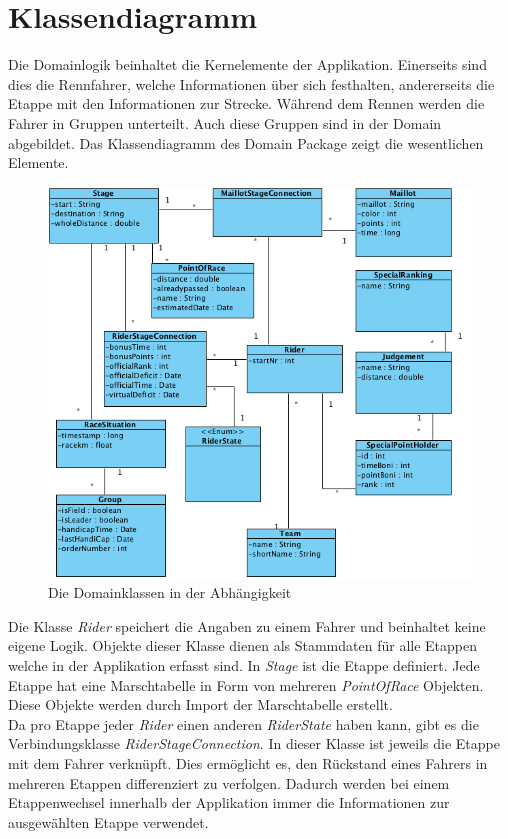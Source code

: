 \section{Klassendiagramm}
Die Domainlogik beinhaltet die Kernelemente der Applikation. Einerseits sind dies die Rennfahrer, welche Informationen über sich festhalten, andererseits die Etappe mit den Informationen zur Strecke. Während dem Rennen werden die Fahrer in Gruppen unterteilt. Auch diese Gruppen sind in der Domain abgebildet. Das Klassendiagramm des Domain Package zeigt die wesentlichen Elemente.

\begin{figure}[h!]
\caption{Die Domainklassen in der Abhängigkeit}
\label{fig:domain}
\centering
\includegraphics[scale=0.9]{05bericht/images/domain.png}
\end{figure} 


Die Klasse \textit{Rider} speichert die Angaben zu einem Fahrer und beinhaltet keine eigene Logik. Objekte dieser Klasse dienen als Stammdaten für alle Etappen welche in der Applikation erfasst sind.
In \textit{Stage} ist die Etappe definiert. Jede Etappe hat eine Marschtabelle in Form von mehreren \textit{PointOfRace} Objekten. Diese Objekte werden durch Import der Marschtabelle erstellt.
\\

Da pro Etappe jeder \textit{Rider} einen anderen \textit{RiderState} haben kann, gibt es die Verbindungsklasse \textit{RiderStageConnection}. In dieser Klasse ist jeweils die Etappe mit dem Fahrer verknüpft. Dies ermöglicht es, den Rückstand eines Fahrers in mehreren Etappen differenziert zu verfolgen. Dadurch werden bei einem Etappenwechsel innerhalb der Applikation immer die Informationen zur ausgewählten Etappe verwendet.

